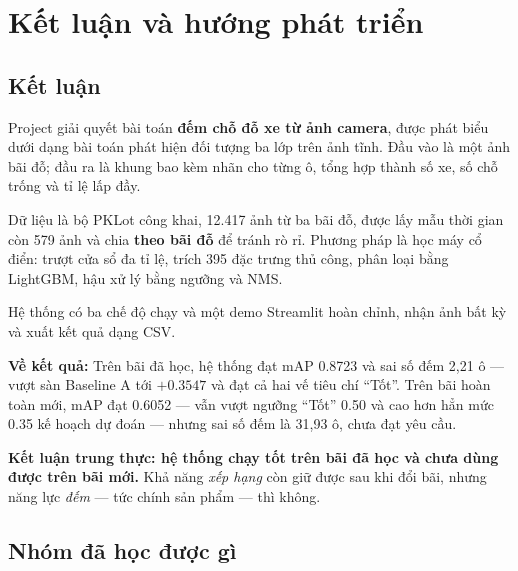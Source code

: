 \documentclass[12pt]{ai_conquer2026}
\begin{document}
\newpage
\section{Kết luận và hướng phát triển}

\subsection{Kết luận}

Project giải quyết bài toán \textbf{đếm chỗ đỗ xe từ ảnh camera}, được phát biểu dưới dạng bài toán phát hiện đối tượng ba lớp trên ảnh tĩnh. Đầu vào là một ảnh bãi đỗ; đầu ra là khung bao kèm nhãn cho từng ô, tổng hợp thành số xe, số chỗ trống và tỉ lệ lấp đầy.

Dữ liệu là bộ PKLot công khai, 12.417 ảnh từ ba bãi đỗ, được lấy mẫu thời gian còn 579 ảnh và chia \textbf{theo bãi đỗ} để tránh rò rỉ. Phương pháp là học máy cổ điển: trượt cửa sổ đa tỉ lệ, trích 395 đặc trưng thủ công, phân loại bằng LightGBM, hậu xử lý bằng ngưỡng và NMS.

Hệ thống có ba chế độ chạy và một demo Streamlit hoàn chỉnh, nhận ảnh bất kỳ và xuất kết quả dạng CSV.

\textbf{Về kết quả:} Trên bãi đã học, hệ thống đạt mAP 0.8723 và sai số đếm 2,21 ô --- vượt sàn Baseline A tới $+0.3547$ và đạt cả hai vế tiêu chí ``Tốt''. Trên bãi hoàn toàn mới, mAP đạt 0.6052 --- vẫn vượt ngưỡng ``Tốt'' 0.50 và cao hơn hẳn mức 0.35 kế hoạch dự đoán --- nhưng sai số đếm là 31,93 ô, chưa đạt yêu cầu.

\textbf{Kết luận trung thực: hệ thống chạy tốt trên bãi đã học và chưa dùng được trên bãi mới.} Khả năng \textit{xếp hạng} còn giữ được sau khi đổi bãi, nhưng năng lực \textit{đếm} --- tức chính sản phẩm --- thì không.

\subsection{Nhóm đã học được gì}
\end{document}
